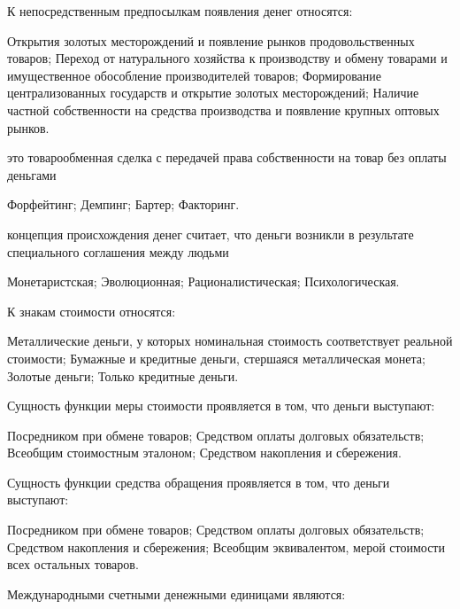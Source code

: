 \documentclass[12pt, table]{exam}
\begin{document}
\begin{questions}
\begin{multicols}{2}
\setlength{\columnsep}{1cm}

\question К непосредственным предпосылкам появления денег относятся:
	 \begin{choices}
	 \choice Открытия золотых месторождений и появление рынков продовольственных товаров;
	 \choice Переход от натурального хозяйства к производству и обмену товарами и имущественное обособление производителей товаров;
	 \CC Формирование централизованных государств и открытие золотых месторождений;
	 \choice Наличие частной собственности на средства производства и появление крупных оптовых рынков.
	 \end{choices}
\question   это товарообменная сделка с передачей права собственности на товар без оплаты деньгами
	 \begin{choices}
	 \choice Форфейтинг;
	 \choice Демпинг;
	 \choice Бартер;
	 \CC Факторинг.
	 \end{choices}
\question  концепция происхождения денег считает, что деньги возникли в результате специального соглашения между людьми
	 \begin{choices}
	 \choice Монетаристская;
	 \choice Эволюционная;
	 \choice Рационалистическая;
	 \CC Психологическая.
	 \end{choices}
\question К знакам стоимости относятся:
	 \begin{choices}
	 \choice Металлические деньги, у которых номинальная стоимость соответствует реальной стоимости;
	 \choice Бумажные и кредитные деньги, стершаяся металлическая монета;
	 \CC Золотые деньги;
	 \choice Только кредитные деньги.
	 \end{choices}
\question Сущность функции меры стоимости проявляется в том, что деньги выступают:
	 \begin{choices}
	 \CC Посредником при обмене товаров;
	 \choice Средством оплаты долговых обязательств;
	 \choice Всеобщим стоимостным эталоном;
	 \choice Средством накопления и сбережения.
	 \end{choices}
\question Сущность функции средства обращения проявляется в том, что деньги выступают:
	 \begin{choices}
	 \choice Посредником при обмене товаров;
	 \choice Средством оплаты долговых обязательств;
	 \CC Средством накопления и сбережения;
	 \choice Всеобщим эквивалентом, мерой стоимости всех остальных товаров.
	 \end{choices}
\question Международными счетными денежными единицами являются:

\end{multicols}
\end{questions}
\end{document}
